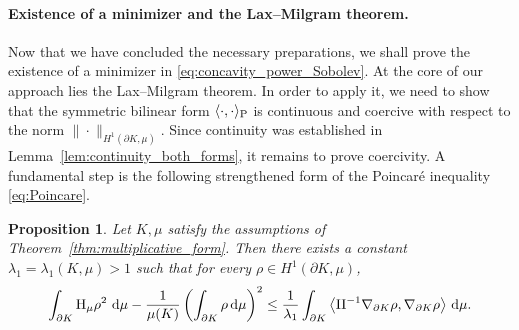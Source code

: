 \documentclass[a4paper, 11pt]{article}
\newtheorem{proposition}[theorem]{Proposition}
\theoremstyle{definition}
\newcommand{\di}{\, \mathrm{d}}
\begin{document}
\paragraph{Existence of a minimizer and the Lax--Milgram theorem.} Now that we have concluded the necessary preparations, we shall prove the existence of a minimizer in \eqref{eq:concavity_power_Sobolev}. At the core of our approach lies the Lax--Milgram theorem. In order to apply it, we need to show that the symmetric bilinear form $\langle \cdot, \cdot \rangle_{\rm P}$ is continuous and coercive with respect to the norm $\|\cdot\|_{H^{1}(\partial K,\mu)}$. Since continuity was established in Lemma~\ref{lem:continuity_both_forms}, it remains to prove coercivity. A fundamental step is the following strengthened form of the Poincar\'e inequality \eqref{eq:Poincare}.
\begin{proposition}\label{Prop:Bilinear_vs_gradient norm}
Let $K,\mu$ satisfy the assumptions of Theorem~\ref{thm:multiplicative_form}. Then there exists a constant $\lambda_{1}=\lambda_{1}(K,\mu)>1$ such that for every $\rho \in H^{1}(\partial K,\mu)$,
\begin{equation}\label{eq:Boundary_Improved_Poincare}
   \int_{\partial K}{\rm H}_\mu\rho^2\,\di\mu -\frac{1}{\mu(K)}\left( \int_{\partial K}\rho\di\mu \right)^2 \leq  \frac{1}{\lambda_1}\int_{\partial K} \left\langle {\rm II}^{-1}\nabla_{\partial K}\rho, \nabla_{\partial K} \rho \right\rangle \di\mu.
\end{equation}
\end{proposition}
\end{document}
